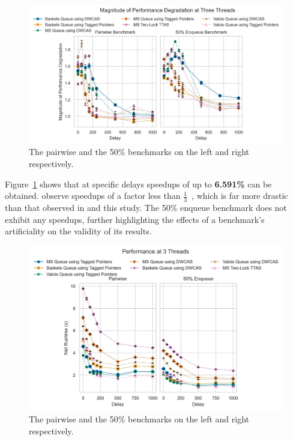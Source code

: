 \begin{figure}[!ht]
    \centering
    \includegraphics[width=1\textwidth]{images/plots/speedup_2.jpg}
    \caption{The pairwise and the 50\% benchmarks on the left and right respectively.}
    \label{fig:perf_deg_2_thread}
\end{figure}

Figure~\ref{fig:perf_deg_2_thread} shows that at specific delays\textemdash
speedups of up to \textbf{6.591\%} can be obtained.
\citeauthor{michael1996simple} observe speedups of a factor less than
$\frac{1}{3}$~\citep{michael1996simple}, which is far more drastic than that
observed in \citep{ladan2008optimistic, hoffman2007baskets} and this study. The
50\% enqueue benchmark does not exhibit any speedups, further highlighting the
effects of a benchmark's artificiality on the validity of its results.

\begin{figure}[!ht]
    \centering
    \includegraphics[width=1\textwidth]{images/plots/delay_thread_3.jpg}
    \caption{The pairwise and the 50\% benchmarks on the left and right respectively.}
    \label{fig:perf_3_thread}
\end{figure}

